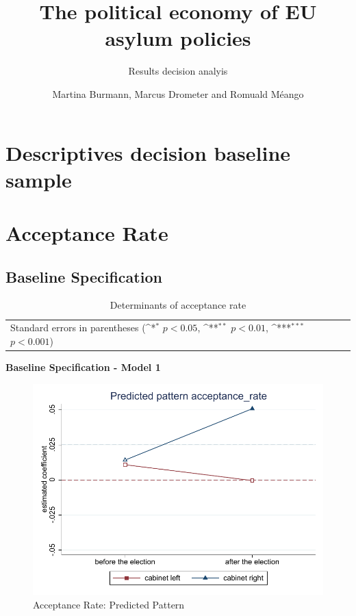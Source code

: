 \documentclass[10pt,a4paper]{scrartcl}
\begin{document}
	\title{The political economy of EU asylum policies}
	\subtitle{Results decision analyis}
	\author{Martina Burmann, Marcus Drometer and Romuald Méango}
	\maketitle


\tableofcontents

\clearpage
\FloatBarrier
\section{Descriptives decision baseline sample}

 

 
 
 

\clearpage
\FloatBarrier
\section{Acceptance Rate}
\subsection{Baseline Specification}
\begin{table}[!ht]\centering
\renewcommand{\arraystretch}{1.25}
\small
\def\sym#1{\ifmmode^{#1}\else\(^{#1}\)\fi}
\caption{Determinants of acceptance rate}
\begin{tabular}{l*{3}{c}}
	\hline\hline
	
	\hline\hline
	\multicolumn{4}{l}{\footnotesize Standard errors in parentheses (\sym{*} \(p<0.05\), \sym{**} \(p<0.01\), \sym{***} \(p<0.001\))}\\
\end{tabular}
\end{table}

\clearpage
\textbf{Baseline Specification - Model 1}
\begin{figure}[!ht]
	\centering
	\includegraphics[width=1\textwidth]{figures_edited/acceptance_rate_graph1_baseline.pdf}
	\caption{Acceptance Rate: Predicted Pattern}
\end{figure}
\end{document}
